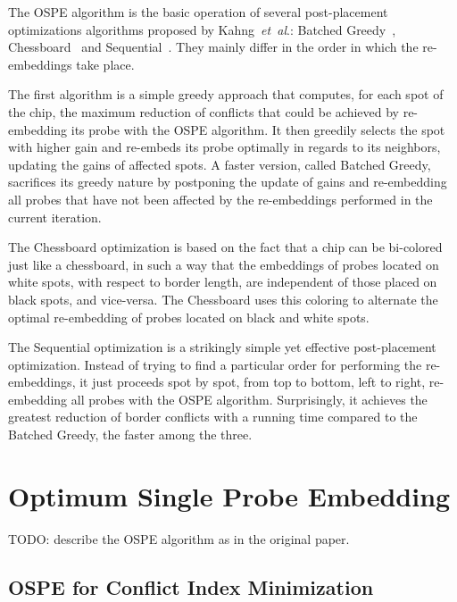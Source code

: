 \documentclass{llncs}
\begin{document}
The OSPE algorithm is the basic operation of several post-placement optimizations
algorithms proposed by Kahng~{\it et~al}.: Batched Greedy~\cite{KAHNG02},
Chessboard~\cite{KAHNG02} and Sequential~\cite{KAHNG03B}. They mainly differ in
the order in which the re-embeddings take place.

The first algorithm is a simple greedy approach that computes, for each spot of the chip,
the maximum reduction of conflicts that could be achieved by re-embedding its probe with
the OSPE algorithm. It then greedily selects the spot with higher gain and re-embeds
its probe optimally in regards to its neighbors, updating the gains of affected
spots. A faster version, called Batched Greedy, sacrifices its greedy nature by postponing
the update of gains and re-embedding all probes that have not been affected by the
re-embeddings performed in the current iteration.

The Chessboard optimization is based on the fact that a chip can be bi-colored
just like a chessboard, in such a way that the embeddings of probes located on
white spots, with respect to border length, are independent of those placed on black spots,
and vice-versa. The Chessboard uses this coloring to alternate the optimal re-embedding
of probes located on black and white spots.

The Sequential optimization is a strikingly simple yet effective post-placement
optimization. Instead of trying to find a particular order for performing the
re-embeddings, it just proceeds spot by spot, from top to bottom, left to right,
re-embedding all probes with the OSPE algorithm. Surprisingly, it achieves the greatest
reduction of border conflicts with a running time compared to the Batched Greedy,
the faster among the three.

\section{Optimum Single Probe Embedding}
\label{sec:ospe}

TODO: describe the OSPE algorithm as in the original paper.

\subsection{OSPE for Conflict Index Minimization}
\label{sec:ospe_ci}
\end{document}

